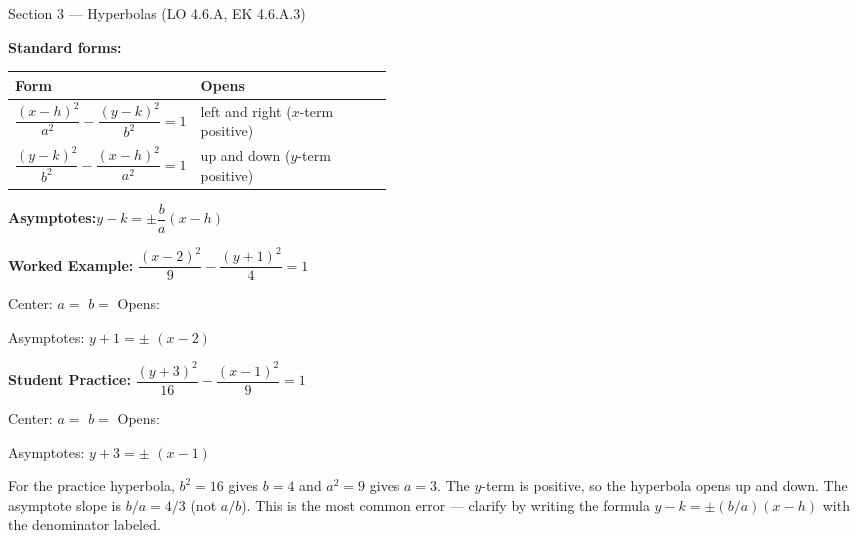 \documentclass[10pt]{article}
\begin{document}
\begin{notesbox}{Section 3 --- Hyperbolas (LO 4.6.A, EK 4.6.A.3)}

\textbf{Standard forms:}

\vspace{4pt}
\renewcommand{\arraystretch}{1.8}
\begin{tabularx}{\linewidth}{@{} p{0.44\linewidth} X @{}}
\textbf{Form} & \textbf{Opens} \\
\midrule
$\dfrac{(x-h)^2}{a^2} - \dfrac{(y-k)^2}{b^2} = 1$ &
  left and right ($x$-term positive) \\[4pt]
$\dfrac{(y-k)^2}{b^2} - \dfrac{(x-h)^2}{a^2} = 1$ &
  up and down ($y$-term positive) \\
\end{tabularx}

\vspace{8pt}
\textbf{Asymptotes:}\quad $y - k = \pm\dfrac{b}{a}(x - h)$

\vspace{10pt}
\textbf{Worked Example:}\quad
$\dfrac{(x-2)^2}{9} - \dfrac{(y+1)^2}{4} = 1$

Center:  \quad $a =$  \quad $b =$  \quad
Opens: 

Asymptotes: $y + 1 = \pm$  $(x - 2)$

\vspace{10pt}
\textbf{Student Practice:}\quad
$\dfrac{(y+3)^2}{16} - \dfrac{(x-1)^2}{9} = 1$

Center:  \quad $a =$  \quad $b =$  \quad
Opens: 

Asymptotes: $y + 3 = \pm$  $(x - 1)$

\end{notesbox}

\begin{teachernote}
For the practice hyperbola, $b^2 = 16$ gives $b = 4$ and $a^2 = 9$ gives $a = 3$.
The $y$-term is positive, so the hyperbola opens up and down. The asymptote slope
is $b/a = 4/3$ (not $a/b$). This is the most common error --- clarify by writing
the formula $y - k = \pm(b/a)(x-h)$ with the denominator labeled.
\end{teachernote}
\end{document}

